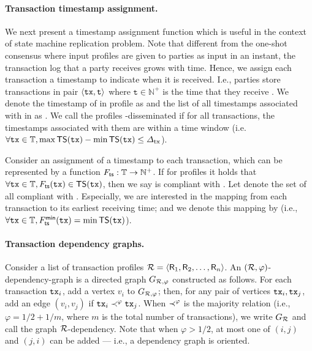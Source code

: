 \paragraph{Transaction timestamp assignment.}
%
We next present a timestamp assignment function \mapTimestamp which is useful in the context of state machine replication problem.
%
Note that different from the one-shot consensus where input profiles are given to parties as input in an instant, the transaction log that a party receives grows with time.
%
Hence, we assign each transaction a timestamp to indicate when it is received.
%
I.e., parties store transactions in pair $\langle \mathtt{tx}, \mathtt{t} \rangle$ where $\mathtt{t} \in \mathbb{N}^+$ is the time that they receive \tx.
%
We denote the timestamp of \tx in profile \profile as \timestamp{\tx, \profile} and the list of all timestamps associated with \tx in \profileSet as \timestamp{\tx}.
%
We call the profiles \profileSet \txDelay-disseminated if for all transactions, the timestamps associated with them are within a \txDelay time window (i.e. $\forall \mathtt{tx} \in \mathbb{T}, \max \mathsf{TS}(\mathtt{tx}) - \min \mathsf{TS}(\mathtt{tx}) \le \varDelta_{\mathrm{tx}}$).

Consider an assignment of a timestamp to each transaction, which can be represented by a function $F_{\mathsf{ts}}: \mathbb{T} \rightarrow \mathbb{N}^+$.
%
If for profiles \profileSet it holds that $\forall \mathtt{tx} \in \mathbb{T}, F_{\mathsf{ts}}(\mathtt{tx}) \in \mathsf{TS}(\mathtt{tx})$, then we say \mapTimestamp is compliant with \profileSet.
%
Let \mapTimestampSetR denote the set of all compliant \mapTimestamp with \profileSet.
%
Especially, we are interested in the mapping from each transaction to its earliest receiving time; and we denote this mapping by \mapTimestampMin (i.e., $\forall \mathtt{tx} \in \mathbb{T}, F^{\mathsf{min}}_{\mathsf{ts}}(\mathtt{tx}) = \min \mathsf{TS}(\mathtt{tx})$).

\paragraph{Transaction dependency graphs.}
%
Consider a list of transaction profiles $\mathcal{R} = \langle \mathsf{R}_1, \mathsf{R}_2, \ldots, \mathsf{R}_n \rangle$.
%
An $(\mathcal{R}, \varphi)$-dependency-graph is a directed graph $G_{\mathcal{R}, \varphi}$ constructed as follows.
%
For each transaction $\mathtt{tx}_i$, add a vertex $v_i$ to $G_{\mathcal{R}, \varphi}$; then, for any pair of vertices $\mathtt{tx}_i, \mathtt{tx}_j$, add an edge $(v_i, v_j)$ if $\mathtt{tx}_i \prec^\varphi \mathtt{tx}_j$.
%
When $\prec^\varphi$ is the majority relation (i.e., $\varphi = 1 / 2 + 1 / m$, where $m$ is the total number of transactions), we write $G_\mathcal{R}$ and call the graph $\mathcal{R}$-dependency.
%
Note that when $\varphi > 1 / 2$, at most one of $(i, j)$ and $(j, i)$ can be added --- i.e., a dependency graph is oriented.

